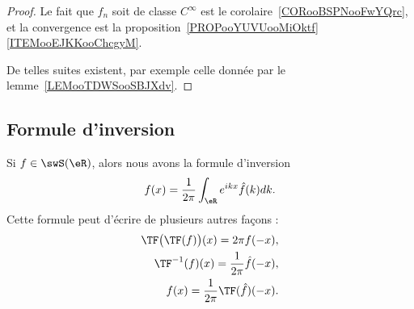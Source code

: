\begin{proof}
    Le fait que \( f_n\) soit de classe \(  C^{\infty}\) est le corolaire~\ref{CORooBSPNooFwYQrc}, et la convergence est la proposition~\ref{PROPooYUVUooMiOktf}\ref{ITEMooEJKKooChcgyM}.

    De telles suites existent, par exemple celle donnée par le lemme~\ref{LEMooTDWSooSBJXdv}.
\end{proof}

\subsection{Formule d'inversion}

\begin{proposition}       \label{PROPooLWTJooReGlaN}
    Si \( f\in\swS(\eR)\), alors nous avons  la formule d'inversion
    \begin{equation}        \label{EQooHIDAooHARdNZ}
        f(x)=\frac{1}{ 2\pi }\int_{\eR} e^{ikx}\hat f(k)dk.
    \end{equation}
    Cette formule peut d'écrire de plusieurs autres façons :
    \begin{subequations}
        \begin{align}
        \TF\big( \TF(f) \big)(x)=2\pi f(-x),\\
        \TF^{-1}(f)(x)=\frac{1}{ 2\pi }\hat f(-x),\\
        f(x)=\frac{1}{ 2\pi }\TF(\hat f)(-x).     \label{EQooWBZTooPeBNeh}
        \end{align}
    \end{subequations}
\end{proposition}

